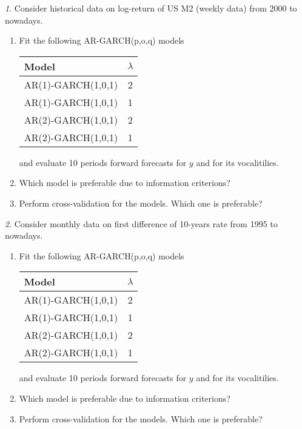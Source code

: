 \documentclass[12pt]{article}
\theoremstyle{remark}
\newtheorem{exercise}{}[section]
\begin{document}
\begin{exercise}
Consider historical data on log-return of US M2 (weekly data) from 2000 to nowadays.
\begin{enumerate}
	\item Fit the following AR-GARCH(p,o,q) models
	\begin{center}
	\begin{tabular}{l|c}
		Model & \(\lambda\) \\ \hline
		AR(1)-GARCH(1,0,1) & 2 \\
		AR(1)-GARCH(1,0,1) & 1 \\
		AR(2)-GARCH(1,0,1) & 2 \\
		AR(2)-GARCH(1,0,1) & 1 \\ \hline
	\end{tabular}
	\end{center} 
	and evaluate 10 periods forward forecasts for \(y\) and for its vocalitilies.
	\item Which model is preferable due to information criterions?
	\item Perform cross-validation for the models. Which one is preferable?
\end{enumerate}
\end{exercise}
	
\begin{exercise}
Consider monthly data on first difference of 10-years rate from 1995 to nowadays.
\begin{enumerate}
	\item Fit the following AR-GARCH(p,o,q) models
	\begin{center}
	\begin{tabular}{l|c}
		Model & \(\lambda\) \\ \hline
		AR(1)-GARCH(1,0,1) & 2 \\
		AR(1)-GARCH(1,0,1) & 1 \\
		AR(2)-GARCH(1,0,1) & 2 \\
		AR(2)-GARCH(1,0,1) & 1 \\ \hline
	\end{tabular}
	\end{center} 
	and evaluate 10 periods forward forecasts for \(y\) and for its vocalitilies.
	\item Which model is preferable due to information criterions?
	\item Perform cross-validation for the models. Which one is preferable?
\end{enumerate}
\end{exercise}
\end{document}
